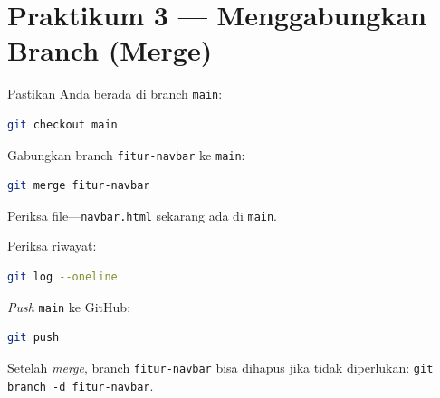 \section{Praktikum 3 --- Menggabungkan Branch (Merge)}
\label{sec:praktik-merge}

\begin{langkah}
  \item Pastikan Anda berada di branch \texttt{main}:
\end{langkah}

\begin{lstlisting}[language=bash, caption={Pindah ke branch main}, label={lst:git-main-again}]
git checkout main
\end{lstlisting}

\begin{langkah}
  \item Gabungkan branch \texttt{fitur-navbar} ke \texttt{main}:
\end{langkah}

\begin{lstlisting}[language=bash, caption={Merge branch fitur-navbar}, label={lst:git-merge}]
git merge fitur-navbar
\end{lstlisting}

\begin{langkah}
  \item Periksa file---\texttt{navbar.html} sekarang ada di \texttt{main}.
  \item Periksa riwayat:
\end{langkah}

\begin{lstlisting}[language=bash, caption={Riwayat setelah merge}, label={lst:git-log-merge}]
git log --oneline
\end{lstlisting}

\begin{langkah}
  \item \emph{Push} \texttt{main} ke GitHub:
\end{langkah}

\begin{lstlisting}[language=bash, caption={Push main ke GitHub}, label={lst:git-push-main}]
git push
\end{lstlisting}

\begin{catatan}
Setelah \emph{merge}, branch \texttt{fitur-navbar} bisa dihapus jika tidak diperlukan: \texttt{git branch -d fitur-navbar}.
\end{catatan}

